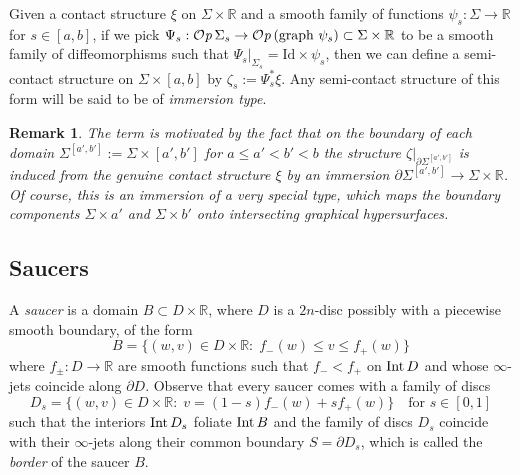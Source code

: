 \documentclass[12pt]{paper}
\theoremstyle{plain}
\newtheorem{remark}[theorem]{Remark}
\theoremstyle{definition}
\newcommand{\p}{\partial}
\newcommand{\eps}{\varepsilon}
\newcommand{\R}{{\mathbb{R}}}
\newcommand{\Int}{{\rm Int\,}} %
\newcommand{\Id}{\mathrm {Id}}
\def\Op{{\mathcal O}{\it p}\,}
\numberwithin{figure}{section}
\begin{document}
Given a contact structure $\xi$ on $\Sigma\times\R$ and a smooth family of functions $\psi_s:\Sigma\to\R$ for $s\in[a,b]$, if
we pick
$\Psi_s: \Op \Sigma_s \to \Op(\mbox{graph } \psi_s) \subset \Sigma \times \R$ to be a
smooth family of diffeomorphisms such that $\Psi_s|_{\Sigma_s} = \Id \times \psi_s$, then
we can define a semi-contact structure on $\Sigma\times[a,b]$ by 
$\zeta_s := \Psi_s^*\xi$.  Any semi-contact structure of this form will be said to be of {\em immersion type}.

\begin{remark} {\rm The term  is motivated by the fact that on  the boundary of each domain
$\Sigma^{[a',b']}:=\Sigma\times[a',b']$ for $a\leq a'<b'<b$ the structure  $\zeta|_{\p \Sigma^{[a',b']}} $ is induced from the genuine contact structure $\xi$ by an immersion 
$\p \Sigma^{[a',b']}\to \Sigma\times\R$. Of course, this is an immersion of a very special type, which maps the  boundary components $\Sigma\times a'$ and $\Sigma\times b'$ onto  intersecting graphical hypersurfaces. }
\end{remark}
%
%    
  
 \subsection{Saucers}\label{sec:saucers}
  \medskip 
 A {\it saucer} is a domain $B \subset D\times\R$, where $D$ is a $2n$-disc possibly with a piecewise smooth boundary, 
 of the form
 $$B=\{(w,v)\in D\times\R:\; f_-(w)\leq v\leq f_+(w)\}$$
 where $f_\pm:D\to\R$ are smooth functions such that
 $f_-<f_+$ on $\Int D$ and whose $\infty$-jets coincide along $\p D$.
Observe that every saucer comes with a family of discs 
$$
D_s=\{(w,v) \in D \times \R:\; v=(1-s)f_-(w)+s f_+(w)\}
\quad\mbox{for $s \in [0,1]$}
$$ 
such that the interiors $\Int D_s$ foliate $\Int B$ and
the family of discs $D_s$ coincide with their $\infty$-jets along their common boundary $S=\p D_s$, which is called the {\em border} of the saucer $B$.
 
\end{document}
